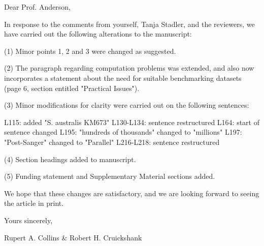 %
%
%
%
%
%
%
%
%



Dear Prof. Anderson,

In response to the comments from yourself, Tanja Stadler, and the reviewers, we have carried out the following alterations to the manuscript: 

(1) Minor points 1, 2 and 3 were changed as suggested.

(2) The paragraph regarding computation problems was extended, and also now incorporates a statement about  the need for suitable benchmarking datasets (page 6, section entitled "Practical Issues").

(3) Minor modifications for clarity were carried out on the following sentences: 

	L115: added "S. australis KM673"
	L130-L134: sentence restructured
	L164: start of sentence changed
	L195: "hundreds of thousands" changed to "millions"
	L197: "Post-Sanger" changed to "Parallel"
	L216-L218:  sentence restructured

(4) Section headings added to manuscript.

(5) Funding statement and Supplementary Material sections added.


We hope that these changes are satisfactory, and we are looking forward to seeing the article in print.

Yours sincerely,

Rupert A. Collins & Robert H. Cruickshank
